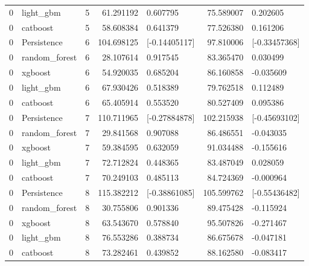 \begin{tabular}{llrrlrl}
0 & light_gbm & 5 & 61.291192 & 0.607795 & 75.589007 & 0.202605 \\
0 & catboost & 5 & 58.608384 & 0.641379 & 77.526380 & 0.161206 \\
0 & Persistence & 6 & 104.698125 & [-0.14405117] & 97.810006 & [-0.33457368] \\
0 & random_forest & 6 & 28.107614 & 0.917545 & 83.365470 & 0.030499 \\
0 & xgboost & 6 & 54.920035 & 0.685204 & 86.160858 & -0.035609 \\
0 & light_gbm & 6 & 67.930426 & 0.518389 & 79.762518 & 0.112489 \\
0 & catboost & 6 & 65.405914 & 0.553520 & 80.527409 & 0.095386 \\
0 & Persistence & 7 & 110.711965 & [-0.27884878] & 102.215938 & [-0.45693102] \\
0 & random_forest & 7 & 29.841568 & 0.907088 & 86.486551 & -0.043035 \\
0 & xgboost & 7 & 59.384595 & 0.632059 & 91.034488 & -0.155616 \\
0 & light_gbm & 7 & 72.712824 & 0.448365 & 83.487049 & 0.028059 \\
0 & catboost & 7 & 70.249103 & 0.485113 & 84.724369 & -0.000964 \\
0 & Persistence & 8 & 115.382212 & [-0.38861085] & 105.599762 & [-0.55436482] \\
0 & random_forest & 8 & 30.755806 & 0.901336 & 89.475428 & -0.115924 \\
0 & xgboost & 8 & 63.543670 & 0.578840 & 95.507826 & -0.271467 \\
0 & light_gbm & 8 & 76.553286 & 0.388734 & 86.675678 & -0.047181 \\
0 & catboost & 8 & 73.282461 & 0.439852 & 88.162580 & -0.083417 \\
\end{tabular}
